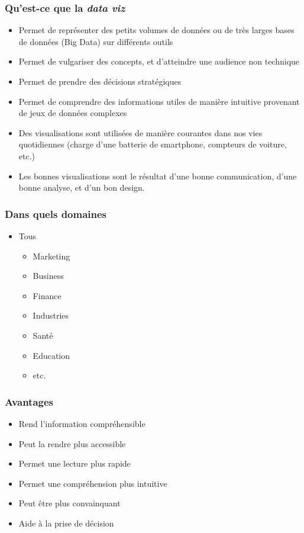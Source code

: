 \begin{frame}\frametitle{Qu'est-ce que la \textit{data viz}}
   \begin{itemize}
      \item Permet de représenter des petits volumes de données ou de très larges bases de données (Big Data) sur différents outils
      \item Permet de vulgariser des concepts, et d'atteindre une audience non technique
      \item Permet de prendre des décisions stratégiques
      \item Permet de comprendre des informations utiles de manière intuitive provenant de jeux de données complexes

      \item Des visualisations sont utilisées de manière courantes dans nos vies quotidiennes (charge d'une batterie de smartphone, compteurs de voiture, etc.)
      \item Les bonnes visualisations sont le résultat d'une bonne communication, d'une bonne analyse, et d'un bon design.
      
   \end{itemize}
\end{frame}

\begin{frame}\frametitle{Dans quels domaines}
   \begin{itemize}
      \item Tous
      \begin{itemize}
         \item Marketing
         \item Business
         \item Finance
         \item Industries
         \item Santé
         \item Education
         \item etc.
      \end{itemize}
   \end{itemize}
\end{frame}

\begin{frame}\frametitle{Avantages}
   \begin{itemize}
      \item Rend l'information compréhensible
      \item Peut la rendre plus accessible
      \item Permet une lecture plus rapide
      \item Permet une compréhension plus intuitive
      \item Peut être plus convainquant %
      \item Aide à la prise de décision
   \end{itemize}
\end{frame}

